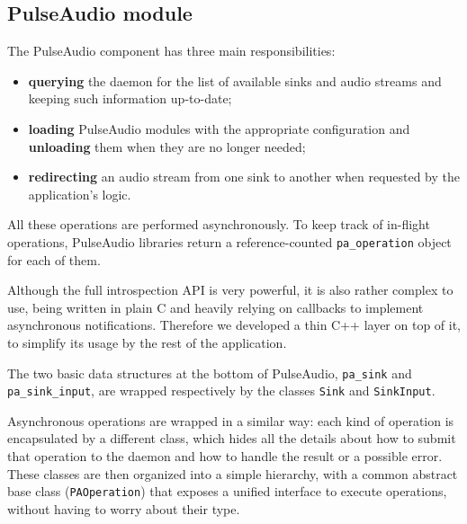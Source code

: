 \documentclass[conference]{IEEEtran}
\begin{document}
\subsection{PulseAudio module}
The PulseAudio component has three main responsibilities:
\begin{itemize}
	\item \textbf{querying} the daemon for the list of available sinks and audio streams and keeping such information up-to-date;
	\item \textbf{loading} PulseAudio modules with the appropriate configuration and \textbf{unloading} them when they are no longer needed;
	\item \textbf{redirecting} an audio stream from one sink to another when requested by the application's logic.
\end{itemize}
All these operations are performed asynchronously. To keep track of in-flight operations, PulseAudio libraries return a reference-counted \texttt{pa\_operation} object for each of them.

Although the full introspection API is very powerful, it is also rather complex to use, being written in plain C and heavily relying on callbacks to implement asynchronous notifications. Therefore we developed a thin C++ layer on top of it, to simplify its usage by the rest of the application.

The two basic data structures at the bottom of PulseAudio, \texttt{pa\_sink} and \texttt{pa\_sink\_input}, are wrapped respectively by the classes \texttt{Sink} and \texttt{SinkInput}.

Asynchronous operations are wrapped in a similar way: each kind of operation is encapsulated by a different class, which hides all the details about how to submit that operation to the daemon and how to handle the result or a possible error. These classes are then organized into a simple hierarchy, with a common abstract base class (\texttt{PAOperation}) that exposes a unified interface to execute operations, without having to worry about their type.
\end{document}
